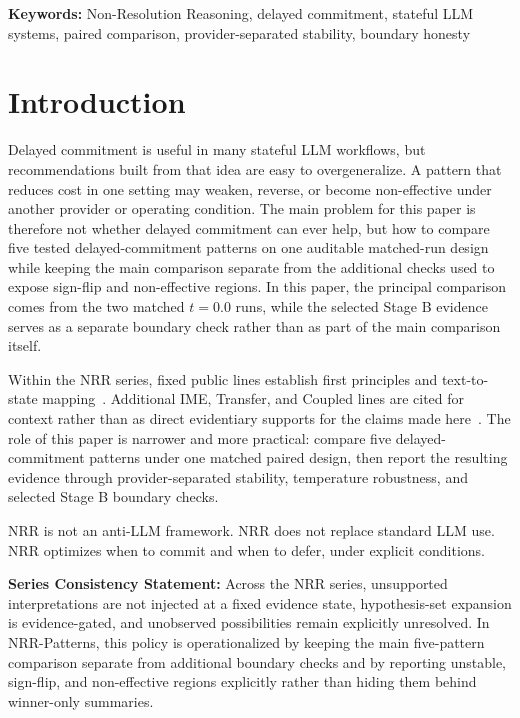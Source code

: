 \documentclass[11pt,a4paper]{article}
\begin{document}
\noindent\textbf{Keywords:} Non-Resolution Reasoning, delayed commitment, stateful LLM systems, paired comparison, provider-separated stability, boundary honesty

\section{Introduction}
\label{sec:intro}

Delayed commitment is useful in many stateful LLM workflows, but
recommendations built from that idea are easy to overgeneralize. A pattern
that reduces cost in one setting may weaken, reverse, or become non-effective
under another provider or operating condition. The main problem for this paper
is therefore not whether delayed commitment can ever help, but how to compare
five tested delayed-commitment patterns on one auditable matched-run design
while keeping the main comparison separate from the additional checks used to
expose sign-flip and non-effective regions. In this paper, the principal
comparison comes from the two matched \(t=0.0\) runs, while the selected Stage
B evidence serves as a separate boundary check rather than as part of the main
comparison itself.

Within the NRR series, fixed public lines establish first principles and
text-to-state mapping~\cite{saito2025nrr,saito2026phi}. Additional IME,
Transfer, and Coupled lines are cited for context rather than as direct
evidentiary supports for the claims made here~\cite{saito2026ime,saito2026transfer,saito2026coupled}. The role of this paper is narrower and more practical:
compare five delayed-commitment patterns under one matched paired design, then
report the resulting evidence through provider-separated stability,
temperature robustness, and selected Stage B boundary checks.

NRR is not an anti-LLM framework.
NRR does not replace standard LLM use.
NRR optimizes when to commit and when to defer, under explicit conditions.

\textbf{Series Consistency Statement:}
Across the NRR series, unsupported interpretations are not injected at a fixed evidence state, hypothesis-set expansion is evidence-gated, and unobserved possibilities remain explicitly unresolved. In NRR-Patterns, this policy is operationalized by keeping the main five-pattern comparison separate from additional boundary checks and by reporting unstable, sign-flip, and non-effective regions explicitly rather than hiding them behind winner-only summaries.
\end{document}
